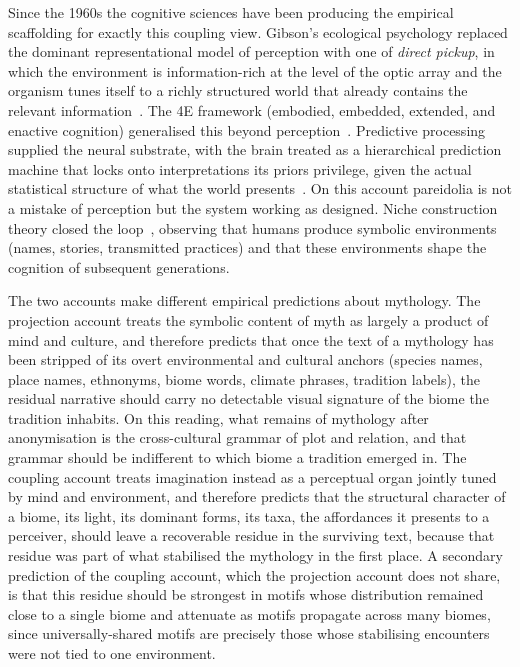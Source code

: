 \documentclass[11pt,a4paper]{article}
\begin{document}
Since the 1960s the cognitive sciences have been producing the
empirical scaffolding for exactly this coupling view. Gibson's
ecological psychology replaced the dominant representational model
of perception with one of \emph{direct pickup}, in which the
environment is information-rich at the level of the optic array and
the organism tunes itself to a richly structured world that already
contains the relevant
information~\citep{gibson1979ecological}. The 4E framework
(embodied, embedded, extended, and enactive cognition) generalised
this beyond
perception~\citep{varela1991embodied,clark1998extended,noe2004action}.
Predictive processing supplied the neural substrate, with the brain
treated as a hierarchical prediction machine that locks onto
interpretations its priors privilege, given the actual statistical
structure of what the world
presents~\citep{friston2010free,clark2016surfing,hohwy2013predictive}.
On this account pareidolia is not a mistake of perception but the
system working as designed. Niche construction theory closed the
loop~\citep{odlingsmee2003niche}, observing that humans produce
symbolic environments (names, stories, transmitted practices) and
that these environments shape the cognition of subsequent generations.

The two accounts make different empirical predictions about
mythology. The projection account treats the symbolic content of
myth as largely a product of mind and culture, and therefore
predicts that once the text of a mythology has been stripped of its
overt environmental and cultural anchors (species names, place
names, ethnonyms, biome words, climate phrases, tradition labels),
the residual narrative should carry no detectable visual signature
of the biome the tradition inhabits.
On this reading, what remains of mythology after anonymisation is
the cross-cultural grammar of plot and relation, and that grammar
should be indifferent to which biome a tradition emerged in. The
coupling account treats imagination instead as a perceptual organ
jointly tuned by mind and environment, and therefore predicts that
the structural character of a biome, its light, its dominant forms,
its taxa, the affordances it presents to a perceiver, should leave
a recoverable residue in the surviving text, because that residue
was part of what stabilised the mythology in the first place. A
secondary prediction of the coupling account, which the projection
account does not share, is that this residue should be strongest in
motifs whose distribution remained close to a single biome and
attenuate as motifs propagate across many biomes, since
universally-shared motifs are precisely those whose stabilising
encounters were not tied to one environment.
\end{document}
